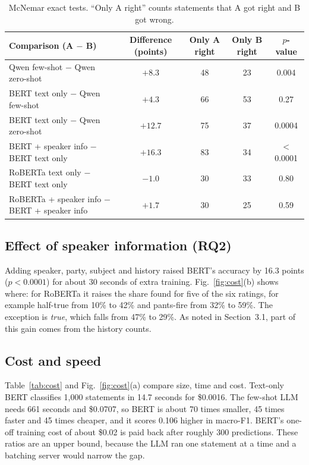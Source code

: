\documentclass[10pt,a4paper,twoside]{article}
\begin{document}
\begin{table}[H]
\centering\small
\caption{McNemar exact tests. ``Only A right'' counts statements that A got right and B got wrong.}
\label{tab:sig}
\begin{tabular}{lcccc}
\toprule
Comparison (A $-$ B) & Difference (points) & Only A right & Only B right & $p$-value \\
\midrule
Qwen few-shot $-$ Qwen zero-shot & $+8.3$ & 48 & 23 & 0.004 \\
BERT text only $-$ Qwen few-shot & $+4.3$ & 66 & 53 & 0.27 \\
BERT text only $-$ Qwen zero-shot & $+12.7$ & 75 & 37 & 0.0004 \\
BERT + speaker info $-$ BERT text only & $+16.3$ & 83 & 34 & $<$0.0001 \\
RoBERTa text only $-$ BERT text only & $-1.0$ & 30 & 33 & 0.80 \\
RoBERTa + speaker info $-$ BERT + speaker info & $+1.7$ & 30 & 25 & 0.59 \\
\bottomrule
\end{tabular}
\end{table}

\subsection{Effect of speaker information (RQ2)}
Adding speaker, party, subject and history raised BERT's accuracy by 16.3 points ($p<0.0001$) for about 30 seconds of extra training. Fig.~\ref{fig:cost}(b) shows where: for RoBERTa it raises the share found for five of the six ratings, for example half-true from 10\% to 42\% and pants-fire from 32\% to 59\%. The exception is \emph{true}, which falls from 47\% to 29\%. As noted in Section~3.1, part of this gain comes from the history counts.

\subsection{Cost and speed}
Table~\ref{tab:cost} and Fig.~\ref{fig:cost}(a) compare size, time and cost. Text-only BERT classifies 1,000 statements in 14.7 seconds for \$0.0016. The few-shot LLM needs 661 seconds and \$0.0707, so BERT is about 70 times smaller, 45 times faster and 45 times cheaper, and it scores 0.106 higher in macro-F1. BERT's one-off training cost of about \$0.02 is paid back after roughly 300 predictions. These ratios are an upper bound, because the LLM ran one statement at a time and a batching server would narrow the gap.
\end{document}
